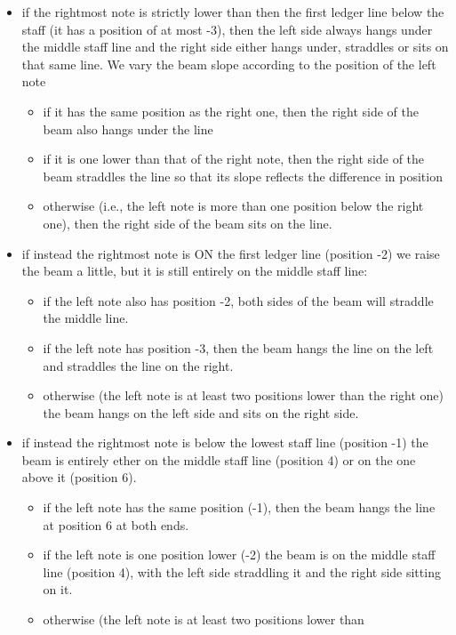 \begin{itemize}
\item if the rightmost note is strictly lower than then the first
  ledger line below the staff (it has a position of at most -3), then
  the left side always hangs under the middle staff line and the right
  side either hangs under, straddles or sits on that same line.  We vary the
  beam slope according to the position of the left note
  \begin{itemize} 
  \item if it has the same position as the right one, then the right
    side of the beam also hangs under the line
  \item if it is one lower than that of the right note, then the right
    side of the beam straddles the line so that its slope reflects the
    difference in position
  \item otherwise (i.e., the left note is more than one position
    below the right one), then the right side of the beam sits on the
    line. 
  \end{itemize}
\item if instead the rightmost note is ON the first ledger line
  (position -2) we raise the beam a little, but it is still entirely
  on the middle staff line:
  \begin{itemize}
  \item if the left note also has position -2, both sides of the
    beam will straddle the middle line.
  \item if the left note has position -3, then the beam hangs the line
    on the left and straddles the line on the right.
  \item otherwise (the left note is at least two positions lower than
    the right one) the beam hangs on the left side and sits on the
    right side. 
  \end{itemize}
\item if instead the rightmost note is below the lowest staff line
  (position -1) the beam is entirely ether on the middle staff line
  (position 4) or on the one above it (position 6). 
  \begin{itemize}
  \item if the left note has the same position (-1), then the beam
    hangs the line at position 6 at both ends. 
  \item if the left note is one position lower (-2) the beam is on the
    middle staff line (position 4), with the left side straddling it and
    the right side sitting on it. 
  \item otherwise (the left note is at least two positions lower than

\end{itemize}
\end{itemize}

